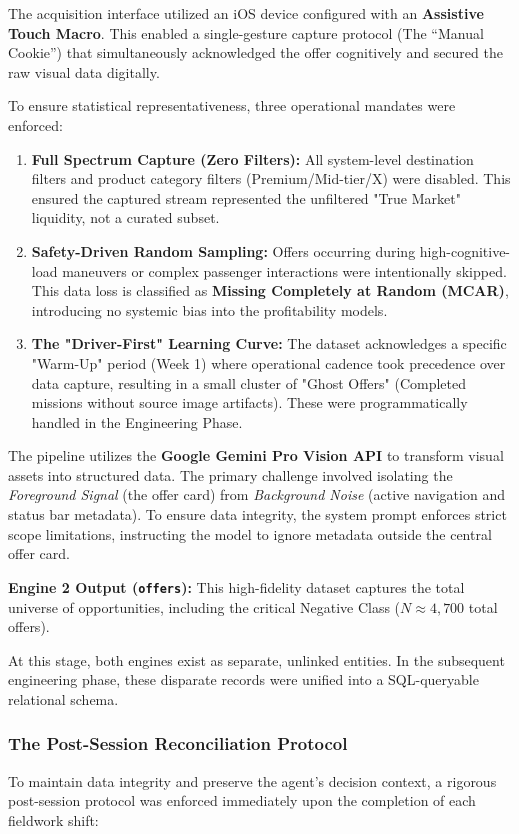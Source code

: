 The acquisition interface utilized an iOS device configured with an \textbf{Assistive Touch Macro}. This enabled a single-gesture capture protocol (The ``Manual Cookie'') that simultaneously acknowledged the offer cognitively and secured the raw visual data digitally. 

To ensure statistical representativeness, three operational mandates were enforced:
\begin{enumerate}
    \item \textbf{Full Spectrum Capture (Zero Filters):} All system-level destination filters and product category filters (Premium/Mid-tier/X) were disabled. This ensured the captured stream represented the unfiltered "True Market" liquidity, not a curated subset.
    \item \textbf{Safety-Driven Random Sampling:} Offers occurring during high-cognitive-load maneuvers or complex passenger interactions were intentionally skipped. This data loss is classified as \textbf{Missing Completely at Random (MCAR)}, introducing no systemic bias into the profitability models.
    \item \textbf{The "Driver-First" Learning Curve:} The dataset acknowledges a specific "Warm-Up" period (Week 1) where operational cadence took precedence over data capture, resulting in a small cluster of "Ghost Offers" (Completed missions without source image artifacts). These were programmatically handled in the Engineering Phase.
\end{enumerate}

The pipeline utilizes the \textbf{Google Gemini Pro Vision API} to transform visual assets into structured data. The primary challenge involved isolating the \textit{Foreground Signal} (the offer card) from \textit{Background Noise} (active navigation and status bar metadata). To ensure data integrity, the system prompt enforces strict scope limitations, instructing the model to ignore metadata outside the central offer card.

\noindent \textbf{Engine 2 Output (\texttt{offers}):} This high-fidelity dataset captures the total universe of opportunities, including the critical Negative Class ($N \approx 4,700$ total offers).

\noindent At this stage, both engines exist as separate, unlinked entities. In the subsequent engineering phase, these disparate records were unified into a SQL-queryable relational schema. 

\subsubsection{The Post-Session Reconciliation Protocol}
To maintain data integrity and preserve the agent's decision context, a rigorous post-session protocol was enforced immediately upon the completion of each fieldwork shift:

